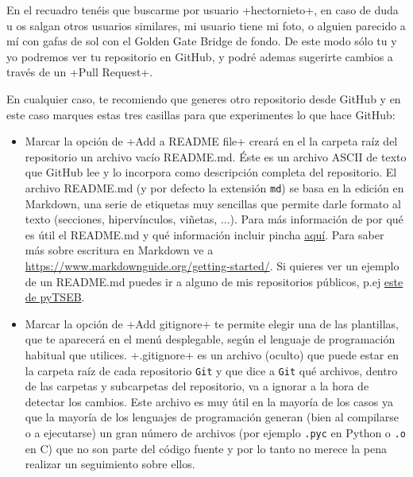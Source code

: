 \documentclass[a5paper,10pt]{article}
\begin{document}
\begin{enumerate}
       En el recuadro tenéis que buscarme por usuario \cverb+hectornieto+, en caso de duda u os salgan otros usuarios similares, mi usuario tiene mi foto, o alguien parecido a mí con gafas de sol con el Golden Gate Bridge de fondo. De este modo sólo tu y yo podremos ver tu repositorio en GitHub, y podré ademas sugerirte cambios a través de un \cverb+Pull Request+.
      \end{enumerate}
       
       En cualquier caso, te recomiendo que generes otro repositorio desde GitHub y en este caso marques estas tres casillas para que experimentes lo que hace GitHub:
       
       \begin{itemize}
        \item Marcar la opción de \cverb+Add a README file+ creará en el la carpeta raíz del repositorio un archivo vacío README.md. Éste es un archivo ASCII de texto que GitHub lee y lo incorpora como descripción completa del repositorio. El archivo README.md (y por defecto la extensión \verb+md+) se basa en la edición en Markdown, una serie de etiquetas muy sencillas que permite darle formato al texto (secciones, hipervínculos, viñetas, ...). Para más información de por qué es útil el README.md y qué información incluir pincha \href{https://github.com/18F/open-source-guide/blob/18f-pages/pages/making-readmes-readable.md}{aquí}. Para saber más sobre escritura en Markdown ve a \url{https://www.markdownguide.org/getting-started/}. Si quieres ver un ejemplo de un README.md puedes ir a alguno de mis repositorios públicos, p.ej \href{https://github.com/hectornieto/pyTSEB/blob/master/README.md}{este de pyTSEB}.
       
        \item Marcar la opción de \cverb+Add gitignore+ te permite elegir una de las plantillas, que te aparecerá en el menú desplegable, según el lenguaje de programación habitual que utilices. \cverb+.gitignore+ es un archivo (oculto) que puede estar en la carpeta raíz de cada repositorio \verb+Git+ y que dice a \verb+Git+ qué archivos, dentro de las carpetas y subcarpetas del repositorio, va a ignorar a la hora de detectar los cambios. Este archivo es muy útil en la mayoría de los casos ya que la mayoría de los lenguajes de programación generan (bien al compilarse o a ejecutarse) un gran número de archivos (por ejemplo \verb+.pyc+ en Python o \verb+.o+ en C) que no son parte del código fuente y por lo tanto no merece la pena realizar un seguimiento sobre ellos.
       

\end{itemize}
\end{document}
